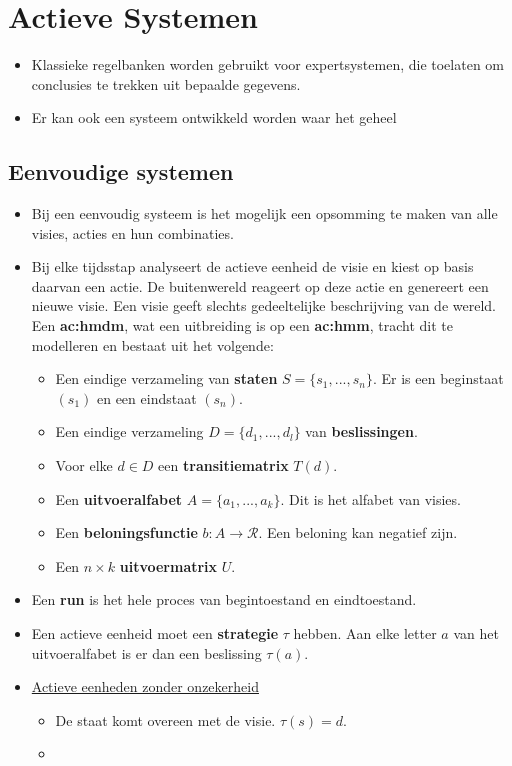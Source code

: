 \chapter{Actieve Systemen}
\begin{itemize}
	\item Klassieke regelbanken worden gebruikt voor expertsystemen, die toelaten om conclusies te trekken uit bepaalde gegevens.
	\item Er kan ook een systeem ontwikkeld worden waar het geheel
\end{itemize}
\section{Eenvoudige systemen}
\begin{itemize}
	\item Bij een eenvoudig systeem is het mogelijk een opsomming te maken van alle visies, acties en hun combinaties.
	\item Bij elke tijdsstap analyseert de actieve eenheid de visie en kiest op basis daarvan een actie. De buitenwereld reageert op deze actie en genereert een nieuwe visie.
	\alert Een visie geeft slechts gedeeltelijke beschrijving van de wereld. Een \textbf{\gls{ac:hmdm}}, wat een uitbreiding is op een \textbf{\gls{ac:hmm}}, tracht dit te modelleren en bestaat uit het volgende:
	\begin{itemize}
		\item Een eindige verzameling van \textbf{staten} $S = \{s_1, ..., s_n\}$. Er is een beginstaat $(s_1)$ en een eindstaat $(s_n)$.
		\item Een eindige verzameling $D = \{d_1, ..., d_l\}$ van \textbf{beslissingen}.
		\item Voor elke $d \in D$ een \textbf{transitiematrix} $T(d)$.
		\item Een \textbf{uitvoeralfabet} $A = \{a_1, ..., a_k\}$. Dit is het alfabet van visies.
		\item Een \textbf{beloningsfunctie} $b: A \rightarrow \mathcal{R}$. Een beloning kan negatief zijn.
		\item Een $n \times k$ \textbf{uitvoermatrix} $U$.
	\end{itemize}
	\item Een \textbf{run} is het hele proces van begintoestand en eindtoestand. 
	\item Een actieve eenheid moet een \textbf{strategie} $\tau$ hebben. Aan elke letter $a$ van het uitvoeralfabet is er dan een beslissing $\tau(a)$.
	\item \underline{Actieve eenheden zonder onzekerheid}
	\begin{itemize}
		\item De staat komt overeen met de visie. $\tau(s) = d$.
		\item 
	\end{itemize}
\end{itemize}

